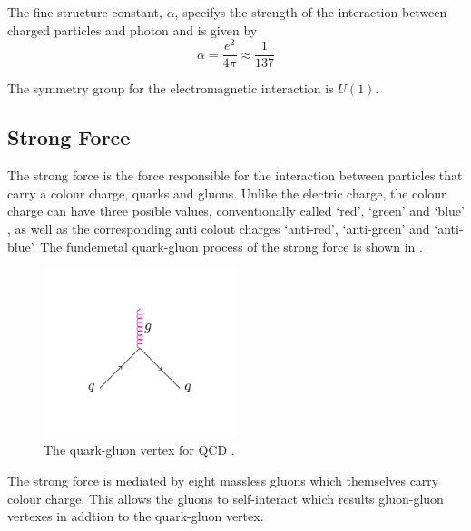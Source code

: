 The fine structure constant, $\alpha$, specifys the strength of the interaction
between charged particles and photon and is given by
\begin{equation}
\alpha = \frac{e^2}{4 \pi} \approx \frac{1}{137}
\end{equation}

The symmetry group for the electromagnetic interaction is $U(1)$. 

\subsection{Strong Force}

The strong force is the force responsible for the interaction between particles
that carry a colour charge, quarks and gluons. Unlike the electric charge, the
colour charge can have three posible values, conventionally called `red',
`green' and `blue' , as well as the corresponding anti colout charges
`anti-red', `anti-green' and `anti-blue'.
The fundemetal quark-gluon process of the strong force is shown in
.
\begin{figure}[htbp]
  \centering
  \includegraphics[width=0.5\textwidth]{qcd_process}
  \caption{The quark-gluon vertex for \ac{QCD} .}
  \label{fig:qcdquark}
\end{figure}
The strong force is mediated by eight massless gluons which themselves carry
colour charge. This allows the gluons to self-interact which results gluon-gluon
vertexes in addtion to the quark-gluon vertex.

